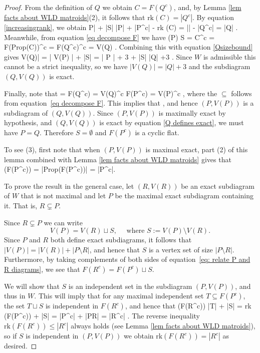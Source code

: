 \documentclass[11pt]{article}
\newcommand{\hlfix}[2]{\texthl{#1}\todo{#2}}
\newcommand{\rk}{\textrm{rk} }
\def\ba #1\ea{\begin{align} #1 \end{align}}
\def\bas #1\eas{\begin{align*} #1 \end{align*}}
\newcommand{\cP}{\mathcal{P}}
\newcommand{\Prop}{\textrm{Prop}}
\theoremstyle{remark}
\theoremstyle{definition}
\begin{document}
\begin{proof}
From the definition of $Q$ we obtain $C = F(Q^c)$, and, by Lemma \ref{lem facts about WLD matroids}(2), it follows that $\rk(C) = |Q^c|$. By equation \eqref{increasingrank}, we obtain
\ba |P| + |S| \leq |P| + |P^c| - \rk(C) = |\cP| - |Q^c| = |Q| \;. \label{Qsizebound}\ea 
Meanwhile, from equation \eqref{eq decompose F} we have
\bas V(P) \sqcup S = C^c = F(\Prop(C))^c = F(Q^c)^c = V(Q) \;. \eas
Combining this with equation \eqref{Qsizebound} gives 
\ba |V(Q)| = | V(P) | + |S| = | P | + 3 + |S| \leq |Q| +3 \;. \label{Q defines exact}\ea
Since $W$ is admissible this cannot be a strict inequality, so we have $|V(Q)| = |Q| +3$ and the subdiagram $(Q, V(Q))$ is exact.

Finally, note that 
\bas C = F(Q^c) = V(Q)^c \subseteq F(P^c) = V(P)^c \;,\eas
where the $\subseteq$ follows from equation~\eqref{eq decompose F}. This implies that \hlfix{$P \subseteq Q$}{sian should go look up why this is true}, and hence $(P, V(P))$ is a subdiagram of $(Q, V(Q))$. Since $(P, V(P))$ is maximally exact by hypothesis, and $(Q, V(Q))$ is exact by equation \eqref{Q defines exact}, we must have $P = Q$. Therefore $S = \emptyset$ and $F(P^c)$ is a cyclic flat.

To see (3), first note that when $(P,V(P))$ is maximal exact, part (2) of this lemma combined with Lemma \ref{lem facts about WLD matroids} gives that
\bas\rk(F(P^c)) = |\Prop(F(P^c))| = |P^c|.\eas

To prove the result in the general case, let $(R,V(R))$ be an exact subdiagram of $W$ that is not maximal and let $P$ be the maximal exact subdiagram containing it. That is, $R \subsetneq P$.

Since $R \subsetneq P$ we can write 
\begin{equation}\label{eq: relate P and R diagrams}V(P) = V(R) \sqcup S, \quad \text{ where } S := V(P) \setminus V(R).\end{equation}
Since $P$ and $R$ both define exact subdiagrams, it follows that $|V(P)| = |V(R)| + |P \setminus R|$, and hence that $S$ is a vertex set of size $|P \setminus R|$. Furthermore, by taking complements of both sides of equation~\eqref{eq: relate P and R diagrams}, we see that $F(R^c) = F(P^c) \sqcup S$. 

We will show that $S$ is an independent set in the subdiagram $(P, V(P))$, and thus in $W$. This will imply that for any maximal independent set $T \subseteq F(P^c)$, the set $T \sqcup S$ is independent in $F(R^c)$, and hence that 
\bas \rk (F(R^c)) \geq |T| + |S| = \rk (F(P^c)) + |S| = |P^c| + |P\setminus R| = |R^c|  \;.\eas 
The reverse inequality $\rk (F(R^c)) \leq |R^c|$ always holds (see Lemma \ref{lem facts about WLD matroids}), so if $S$ is independent in $(P,V(P))$ we obtain $\rk (F(R^c)) = |R^c|$ as desired.


\end{proof}
\end{document}
